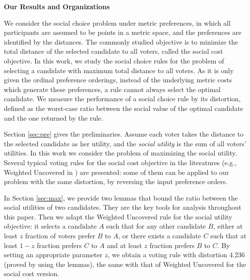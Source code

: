 \documentclass[11pt]{article}
\theoremstyle{remark}
\begin{document}

\medskip\noindent\textbf{Our Results and Organizations}

We consider the social choice problem under metric preferences, in which all participants are assumed to be points in a metric space, and the preferences are identified by the distances. The commonly studied objective is to minimize the total distance of the selected candidate to all voters, called the social cost objective.
In this work, we study the social choice rules for the problem of selecting a candidate with maximum total distance to all voters. As it is  only given the ordinal preference orderings, instead of the underlying metric costs which generate these preferences, a rule cannot always select the optimal candidate. We measure the performance of a social choice rule by its distortion, defined as the worst-case ratio between the social value of the optimal candidate and the one returned by the rule.


Section \ref{sec:pre} gives the preliminaries. Assume each voter takes the distance to the selected candidate as her utility, and the \emph{social utility} is the sum of all voters' utilities. In this work we consider the problem of maximizing the social utility. Several typical voting rules for the social cost objective in the literatures (e.g., Weighted Uncovered in \cite{munagala2019improved}) are presented: some of them can be applied to our problem with the same distortion, by reversing the input preference orders.

In Section \ref{sec:max}, we provide two lemmas that bound the ratio between the social utilities of two candidates. They are the key tools for analysis throughout this paper. Then we adapt the Weighted Uncovered rule for the social utility objective: it selects a candidate $A$ such that for any other candidate $B$, either at least $z$ fraction of voters prefer $B$ to $A$, or there exists a candidate $C$ such that at least $1-z$ fraction prefers $C$ to $A$ and at least $z$ fraction prefers $B$ to $C$. By setting an appropriate parameter $z$, we obtain a voting rule with distortion 4.236 (proved by using the lemmas), the same with that of Weighted Uncovered for the social cost version.
\end{document}

